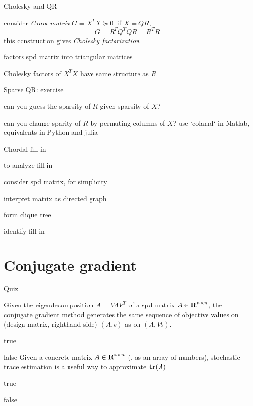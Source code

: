 \documentclass[presentation,xcolor={usenames,dvipsnames}]{beamer}
\begin{document}
\begin{frame}{Cholesky and QR}

consider \emph{Gram matrix} $G = X^T X \succeq 0$. if $X = QR$,
\[
G = R^T Q^T Q R = R^T R
\]
this construction gives \emph{Cholesky factorization} %
\bit
\item factors spd matrix into triangular matrices
\item Cholesky factors of $X^T X$ have same structure as $R$
\eit

\end{frame}

\begin{frame}{Sparse QR: exercise}

\bit
\item can you guess the sparsity of $R$ given sparsity of $X$?
\item can you change sparity of $R$ by permuting columns of $X$?
\eit
\pause use `colamd` in Matlab, equivalents in Python and julia

\end{frame}

\begin{frame}{Chordal fill-in}

to analyze fill-in
\bit
\item consider spd matrix, for simplicity
\item interpret matrix as directed graph
\item form clique tree
\item identify fill-in
\eit
{}


\end{frame}

\section{Conjugate gradient}

\begin{frame}{Quiz}

Given the eigendecomposition $A = V \Lambda V^T$ of a spd matrix $A \in {\mbox{\bf R}}^{n \times n}$,
the conjugate gradient method generates the same sequence of objective values on
(design matrix, righthand side) $(A, b)$ as on $(\Lambda, Vb)$.
\ben[A.]
\item true
\item false
\een
\vfill
Given a concrete matrix $A \in {\mbox{\bf R}}^{n \times n}$ (\eg, as an array of numbers),
stochastic trace estimation is a useful way to approximate $\mathop{\bf tr}(A)$
\ben[A.]
\item true
\item false
\een

\end{frame}
\end{document}
